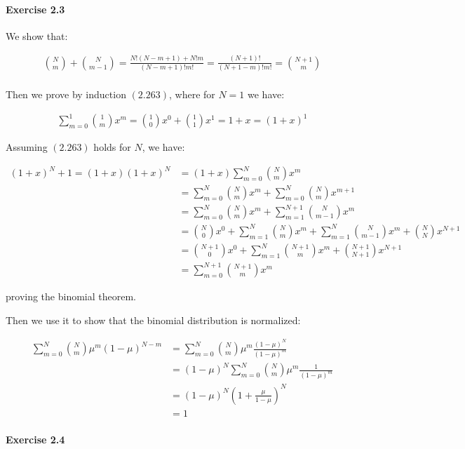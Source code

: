 \paragraph{Exercise 2.3}

We show that:

\begin{align*}
    \binom{N}{m} + \binom{N}{m-1} = \frac{N!(N-m+1) + N!m}{(N-m+1)!m!} = \frac{(N+1)!}{(N+1-m)!m!} = \binom{N+1}{m}\\
\end{align*}

Then we prove by induction $(2.263)$, where for $N=1$ we have:

\begin{align*}
    \sum_{m=0}^{1} \binom{1}{m}x^m = \binom{1}{0} x^0 + \binom{1}{1} x^1 = 1 + x = (1 + x)^1
\end{align*}

Assuming $(2.263)$ holds for $N$, we have:

\begin{align*}
    (1 + x)^N+1 = (1+x)(1+x)^N &= (1 + x) \sum_{m=0}^{N} \binom{N}{m} x^m \\
    &= \sum_{m=0}^{N} \binom{N}{m} x^m + \sum_{m=0}^{N} \binom{N}{m} x^{m+1} \\
    &= \sum_{m=0}^{N} \binom{N}{m} x^m + \sum_{m=1}^{N+1} \binom{N}{m-1} x^{m} \\
    &= \binom{N}{0} x^0 + \sum_{m=1}^{N} \binom{N}{m} x^m + \sum_{m=1}^{N} \binom{N}{m-1} x^{m} + \binom{N}{N} x^{N+1} \\
    &= \binom{N+1}{0} x^0 + \sum_{m=1}^{N} \binom{N+1}{m} x^m + \binom{N+1}{N+1} x^{N+1} \\
    &= \sum_{m=0}^{N+1} \binom{N+1}{m} x^m
\end{align*}

proving the binomial theorem.

Then we use it to show that the binomial distribution is normalized:

\begin{align*}
    \sum_{m=0}^{N} \binom{N}{m} \mu^m (1 - \mu)^{N-m} &= \sum_{m=0}^{N} \binom{N}{m} \mu^m \frac{(1 - \mu)^N}{(1 - \mu)^m} \\
    &= (1 - \mu)^N \sum_{m=0}^N \binom{N}{m} \mu^m \frac{1}{(1-\mu)^m} \\
    &= (1 - \mu)^N (1 + \frac{\mu}{1 - \mu})^N\\
    &= 1
\end{align*}

\paragraph{Exercise 2.4}


